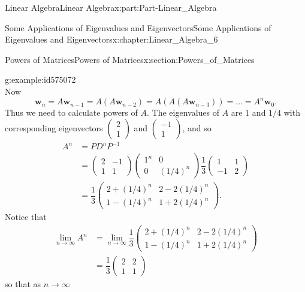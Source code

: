 \documentclass[oneside,10pt,]{book}
\numberwithin{equation}{section}
\newcommand{\bm}[1]{\boldsymbol{#1}}
\newcommand{\amp}{&}
\begin{document}
\begin{partptx}{Linear Algebra}{}{Linear Algebra}{}{}{x:part:Part-Linear_Algebra}
\begin{chapterptx}{Some Applications of Eigenvalues and Eigenvectors}{}{Some Applications of Eigenvalues and Eigenvectors}{}{}{x:chapter:Linear_Algebra_6}
\begin{sectionptx}{Powers of Matrices}{}{Powers of Matrices}{}{}{x:section:Powers_of_Matrices}
\begin{example}{}{g:example:id575072}
\begin{equation*}
\end{equation*}
Now%
\begin{equation*}
\bm{w}_n = A \bm{w}_{n-1} = A \left( A \bm{w}_{n-2} \right) = A \left( A \left( A \bm{w}_{n-3} \right) \right) = \ldots = A^n \bm{w}_0\text{.}
\end{equation*}
Thus we need to calculate powers of \(A\). The eigenvalues of \(A\) are \(1\) and \(1/4\) with corresponding eigenvectors \(\begin{pmatrix} 2 \\ 1 \end{pmatrix}\) and \(\begin{pmatrix} -1 \\ 1 \end{pmatrix}\), and so%
\begin{align*}
A^n \amp = P D^n P^{-1}\\
\amp = \begin{pmatrix} 2 \amp -1 \\ 1 \amp 1 \end{pmatrix} \begin{pmatrix} 1^n \amp 0 \\ 0 \amp (1/4)^n \end{pmatrix} \dfrac{1}{3} \begin{pmatrix} 1 \amp 1 \\ -1 \amp 2 \end{pmatrix}\\
\amp = \dfrac{1}{3} \begin{pmatrix} 2+(1/4)^n \amp 2-2(1/4)^n \\ 1-(1/4)^n \amp 1+2(1/4)^n \end{pmatrix}\text{.}
\end{align*}
Notice that%
\begin{align*}
\lim_{n \to \infty} A^n \amp = \lim_{n \to \infty} \dfrac{1}{3} \begin{pmatrix} 2+(1/4)^n \amp 2-2(1/4)^n \\ 1-(1/4)^n \amp 1+2(1/4)^n \end{pmatrix}\\
\amp = \dfrac{1}{3} \begin{pmatrix} 2 \amp 2 \\ 1 \amp 1 \end{pmatrix}
\end{align*}
so that as \(n \to \infty\)%
\begin{equation*}

\end{equation*}
\end{example}
\end{sectionptx}
\end{chapterptx}
\end{partptx}
\end{document}
